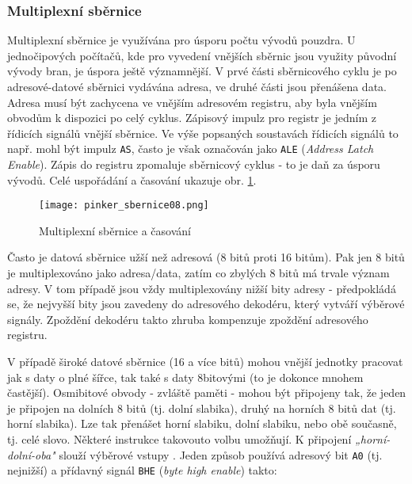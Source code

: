       \subsubsection{Multiplexní sběrnice}\label{MIT:chap_mltiplex_bus} 
        Multiplexní sběrnice je využívána pro úsporu počtu vývodů pouzdra. U jednočipových 
        počítačů, kde pro vyvedení vnějších sběrnic jsou využity původní vývody bran, je úspora 
        ještě významnější. V prvé části sběrnicového cyklu je po adresové-datové sběrnici vydávána 
        adresa, ve druhé části jsou přenášena data. Adresa musí být zachycena ve vnějším adresovém 
        registru, aby byla vnějším obvodům k dispozici po celý cyklus. Zápisový impulz pro registr 
        je jedním z řídicích signálů vnější sběrnice. Ve výše popsaných soustavách řídicích signálů 
        to např. mohl být impulz \texttt{AS}, často je však označován jako \texttt{ALE} 
        (\emph{Address Latch Enable}). Zápis do registru zpomaluje sběrnicový cyklus - to 
        je daň za úsporu vývodů. Celé uspořádání a časování ukazuje obr. \ref{MIT:fig_sbernice08}.
       
        \begin{figure}[ht!] %
          \centering
          \texttt{[image: pinker\_sbernice08.png]}
          \caption{Multiplexní sběrnice a časování}
          \label{MIT:fig_sbernice08}
        \end{figure}
        
        Často je datová sběrnice užší než adresová (8 bitů proti 16 bitům). Pak jen 8 bitů je 
        multiplexováno jako adresa/data, zatím co zbylých 8 bitů má trvale význam adresy. V tom 
        případě jsou vždy multiplexovány nižší bity adresy - předpokládá se, že nejvyšší bity jsou 
        zavedeny do adresového dekodéru, který vytváří výběrové signály. Zpoždění dekodéru takto 
        zhruba kompenzuje zpoždění adresového registru.
        
        V případě široké datové sběrnice (16 a více bitů) mohou vnější jednotky pracovat jak s daty 
        o plné šířce, tak také s daty 8bitovými (to je dokonce mnohem častější). Osmibitové obvody 
        - zvláště paměti -  mohou být připojeny tak, že jeden je připojen na dolních 8 bitů (tj. 
        dolní slabika), druhý na horních 8 bitů dat (tj. horní slabika). Lze tak přenášet horní 
        slabiku, dolní slabiku, nebo obě současně, tj. celé slovo. Některé instrukce takovouto 
        volbu umožňují. K připojení \emph{„horní-dolní-oba"} slouží výběrové vstupy 
        . Jeden způsob používá adresový bit \texttt{A0} (tj. nejnižší) a 
        přídavný signál \texttt{BHE} (\emph{byte high enable}) 
        takto:


